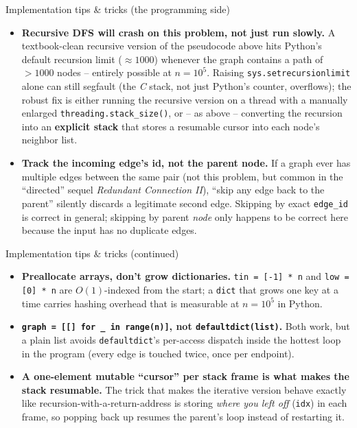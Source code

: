 \documentclass[11pt,aspectratio=169]{beamer}
\begin{document}
\begin{frame}{Implementation tips \& tricks (the programming side)}
  \small
  \begin{itemize}
    \item \textbf{Recursive DFS will crash on this problem, not just run slowly.} A
    textbook-clean recursive version of the pseudocode above hits Python's default
    recursion limit ($\approx 1000$) whenever the graph contains a path of $> 1000$
    nodes -- entirely possible at $n = 10^5$. Raising
    \texttt{sys.setrecursionlimit} alone can still segfault (the \emph{C} stack, not
    just Python's counter, overflows); the robust fix is either running the recursive
    version on a thread with a manually enlarged \texttt{threading.stack\_size()}, or --
    as above -- converting the recursion into an \textbf{explicit stack} that stores a
    resumable cursor into each node's neighbor list.
    \item \textbf{Track the incoming edge's id, not the parent node.} If a graph ever
    has multiple edges between the same pair (not this problem, but common in the
    ``directed'' sequel \emph{Redundant Connection II}), ``skip any edge back to the
    parent'' silently discards a legitimate second edge. Skipping by exact \texttt{edge\_id}
    is correct in general; skipping by parent \emph{node} only happens to be correct
    here because the input has no duplicate edges.
  \end{itemize}
\end{frame}

\begin{frame}{Implementation tips \& tricks (continued)}
  \small
  \begin{itemize}
    \item \textbf{Preallocate arrays, don't grow dictionaries.} \texttt{tin = [-1] * n}
    and \texttt{low = [0] * n} are $O(1)$-indexed from the start; a \texttt{dict} that
    grows one key at a time carries hashing overhead that is measurable at $n=10^5$ in
    Python.
    \item \textbf{\texttt{graph = [[] for \_ in range(n)]}, not \texttt{defaultdict(list)}.}
    Both work, but a plain list avoids \texttt{defaultdict}'s per-access dispatch inside
    the hottest loop in the program (every edge is touched twice, once per endpoint).
    \item \textbf{A one-element mutable ``cursor'' per stack frame is what makes the
    stack resumable.} The trick that makes the iterative version behave exactly like
    recursion-with-a-return-address is storing \emph{where you left off} (\texttt{idx})
    in each frame, so popping back up resumes the parent's loop instead of restarting it.
  \end{itemize}
\end{frame}
\end{document}
